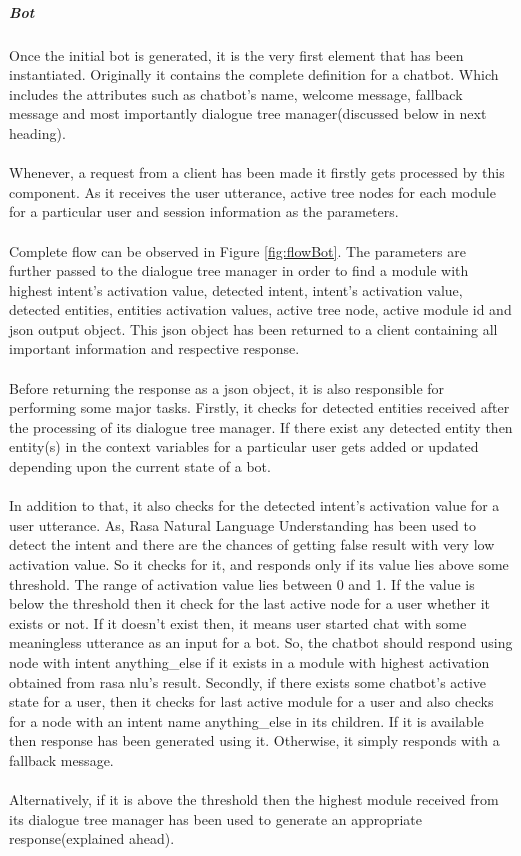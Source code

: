 \subparagraph*{Bot} Once the initial bot is generated, it is the very first element that has been instantiated. Originally it contains the complete definition for a chatbot. Which includes the attributes such as chatbot's name, welcome message, fallback message and most importantly dialogue tree manager(discussed below in next heading).
\\~\\
Whenever, a request from a client has been made it firstly gets processed by this component. As it receives the user utterance, active tree nodes for each module for a particular user and session information as the parameters. 
\\~\\
Complete flow can be observed in Figure \ref{fig:flowBot}. The parameters are further passed to the dialogue tree manager in order to find a module with highest intent's activation value, detected intent, intent's activation value, detected entities, entities activation values, active tree node, active module id and json output object. This json object has been returned to a client containing all important information and respective response.
\\~\\
Before returning the response as a json object, it is also responsible for performing some major tasks. Firstly, it checks for detected entities received after the processing of its dialogue tree manager. If there exist any detected entity then entity(s) in the context variables for a particular user gets added or updated depending upon the current state of a bot.
\\~\\
In addition to that, it also checks for the detected intent's activation value for a user utterance. As, Rasa Natural Language Understanding has been used to detect the intent and there are the chances of getting false result with very low activation value. So it checks for it, and responds only if its value lies above some threshold. The range of activation value lies between 0 and 1. If the value is below the threshold then it check for the last active node for a user whether it exists or not. If it doesn't exist then, it means user started chat with some meaningless utterance as an input for a bot. So, the chatbot should respond using node with intent anything\_else if it exists in a module with highest activation obtained from rasa nlu's result. Secondly, if there exists some chatbot's active state for a user, then it checks for last active module for a user and also checks for a node with an intent name anything\_else in its children. If it is available then response has been generated using it. Otherwise, it simply responds with a fallback message.
\\~\\
Alternatively, if it is above the threshold then the highest module received from its dialogue tree manager has been used to generate an appropriate response(explained ahead).

